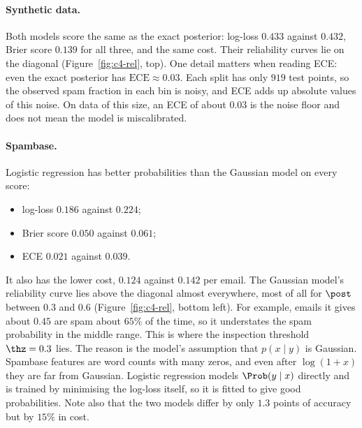 \begin{table}[ht]
\centering\footnotesize\setlength{\tabcolsep}{3.5pt}

\caption{Probability quality on the test part (mean $\pm$ standard error over 20 splits). Accuracy uses
the labels ``spam iff $\post\ge0.5$''. Cost and Inspected are for the Bayes rule with $\cfp=10$,
$\cfn=1$, $\ci=0.3$. ECE uses 10 equal-width bins; equal-count bins give values within $0.003$.
``+ Platt'' rows are re-calibrated on the validation part. Generated by
\texttt{experiments/task3\_calibration.py}.}
\label{tab:c4-scores}
\end{table}

\paragraph{Synthetic data.}
Both models score the same as the exact posterior: log-loss $0.433$ against $0.432$, Brier score
$0.139$ for all three, and the same cost. Their reliability curves lie on the diagonal
(Figure~\ref{fig:c4-rel}, top). One detail matters when reading ECE: even the exact posterior has
$\mathrm{ECE}\approx0.03$. Each split has only $919$ test points, so the observed spam fraction in each bin is
noisy, and ECE adds up absolute values of this noise. On data of this size, an ECE of about $0.03$ is the
noise floor and does not mean the model is miscalibrated.

\paragraph{Spambase.}
Logistic regression has better probabilities than the Gaussian model on every score:
\begin{itemize}[itemsep=1pt,topsep=2pt]
  \item log-loss $0.186$ against $0.224$;
  \item Brier score $0.050$ against $0.061$;
  \item ECE $0.021$ against $0.039$.
\end{itemize}
It also has the lower cost, $0.124$ against $0.142$ per email. The Gaussian model's reliability curve lies
above the diagonal almost everywhere, most of all for $\post$ between $0.3$ and $0.6$
(Figure~\ref{fig:c4-rel}, bottom left). For example,
emails it gives about $0.45$ are spam about $65\%$ of the time, so it understates the spam probability in the
middle range. This is where the inspection threshold $\thz=0.3$ lies. The reason is the model's assumption
that $p(x\mid y)$ is Gaussian. Spambase features are word counts with many zeros, and even after
$\log(1+x)$ they are far from Gaussian. Logistic regression models $\Prob(y\mid x)$ directly and is trained
by minimising the log-loss itself, so it is fitted to give good probabilities. Note also that the two models
differ by only $1.3$ points of accuracy but by $15\%$ in cost.

